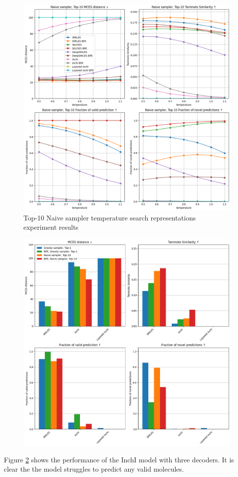 \begin{figure}[H]
    \centering
    \includegraphics[width=1.0\textwidth]{figures/appendix/representations_with_layered_inchi_with_tanimoto.png}
    \caption{Top-10 Naive sampler temperature search representations experiment results}
    \label{fig:representations_appendix}
\end{figure}

\begin{figure}[H]
    \centering
    \includegraphics[width=1.0\textwidth]{figures/appendix/layered_inchi_with_tanimoto.png}
    \caption{}
    \label{fig:layered_inchi}
\end{figure}

Figure \ref{fig:layered_inchi} shows the performance of the InchI model with three decoders. It is clear the the model struggles to predict any valid molecules.